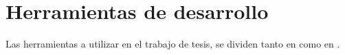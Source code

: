 \section{Herramientas de desarrollo}
\label{sec:herramientas}
Las herramientas a utilizar en el trabajo de tesis, se dividen tanto en  como en .